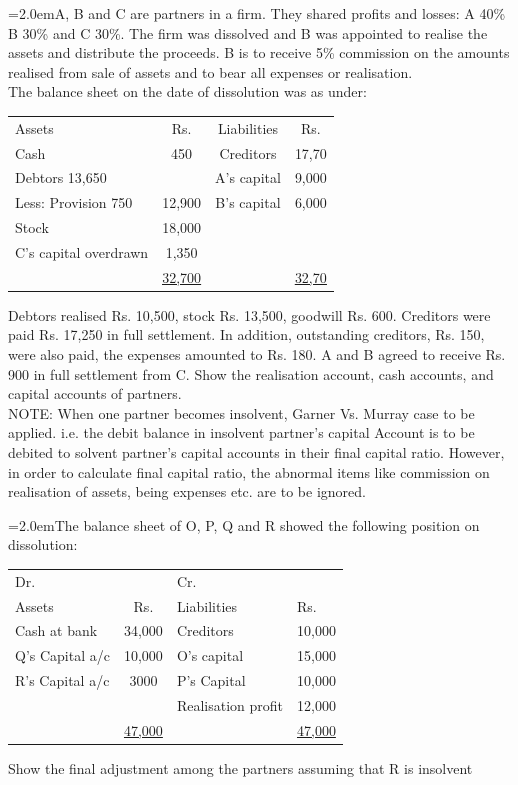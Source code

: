 \documentclass[11pt,a4paper]{article}
\newcommand{\lqn}[2]{\Needspace{6\baselineskip}\par\medskip\noindent\hangindent=2.0em\hangafter=1\makebox[2.0em][l]{\textbf{#1.}}#2\par}
\begin{document}
\lqn{118}{A, B and C are partners in a firm. They shared  profits and losses: A 40\% B 30\% and C 30\%. The firm was dissolved and B was appointed to realise the assets and distribute the proceeds. B is to receive 5\% commission on the amounts realised from sale of assets and to bear all expenses or realisation.\\
The balance sheet on the date of dissolution was as under:\par
\par\smallskip\noindent\hspace*{1.2em}\begin{tabular}{lccc}
Assets & Rs. & Liabilities & Rs. \\
Cash & 450 & Creditors & 17,70 \\
Debtors                 13,650 &  & A’s capital & 9,000 \\
Less: Provision         750 & 12,900 & B’s capital & 6,000 \\
Stock & 18,000 &  &  \\
C’s capital overdrawn & 1,350 &  &  \\
 & \underline{\underline{32,700}} &  & \underline{\underline{32,70}} \\
\end{tabular}\par\smallskip
Debtors realised Rs. 10,500, stock Rs. 13,500, goodwill Rs. 600. Creditors were paid Rs. 17,250 in full settlement. In addition, outstanding creditors, Rs. 150, were also paid, the expenses amounted to Rs. 180. A and B agreed to receive Rs. 900 in full settlement from C. Show the realisation account, cash accounts, and capital accounts of partners.\\
NOTE:  When one partner becomes insolvent, Garner Vs. Murray case to be applied. i.e. the debit balance in insolvent partner’s capital Account is to be debited to solvent partner’s capital accounts in their final capital ratio. However, in order to calculate final capital ratio, the abnormal items like commission on realisation of assets, being expenses etc. are to be ignored.\par
}
\lqn{119}{The balance sheet of O, P, Q and R showed the following position on dissolution:\par
\par\smallskip\noindent\hspace*{1.2em}\begin{tabular}{|lcll|}
\hline
Dr. &  & Cr. &  \\
Assets & Rs. & Liabilities & Rs. \\
Cash at bank & 34,000 & Creditors & 10,000 \\
Q’s Capital a/c & 10,000 & O’s capital & 15,000 \\
R’s Capital a/c & 3000 & P’s Capital & 10,000 \\
 &  & Realisation profit & 12,000 \\
 & \underline{47,000} &  & \underline{47,000} \\
\hline
\end{tabular}\par\smallskip
Show the final adjustment among the partners assuming that R is insolvent\par
}
\end{document}
